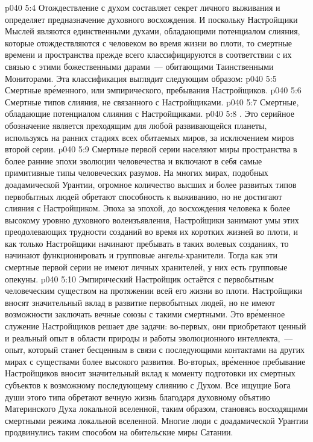 \vs p040 5:4 \pc Отождествление с духом составляет секрет личного выживания и определяет предназначение духовного восхождения. И поскольку Настройщики Мыслей являются единственными духами, обладающими потенциалом слияния, которые отождествляются с человеком во время жизни во плоти, то смертные времени и пространства прежде всего классифицируются в соответствии с их связью с этими божественными дарами~--- обитающими Таинственными Мониторами. Эта классификация выглядит следующим образом:
\vs p040 5:5 Смертные вр\'еменного, или эмпирического, пребывания Настройщиков.
\vs p040 5:6 Смертные типов слияния, не связанного с Настройщиками.
\vs p040 5:7 Смертные, обладающие потенциалом слияния с Настройщиками.
\vs p040 5:8 \pc {}. Это серийное обозначение является преходящим для любой развивающейся планеты, используясь на ранних стадиях всех обитаемых миров, за исключением миров второй серии.
\vs p040 5:9 Смертные первой серии населяют миры пространства в более ранние эпохи эволюции человечества и включают в себя самые примитивные типы человеческих разумов. На многих мирах, подобных доадамической Урантии, огромное количество высших и более развитых типов первобытных людей обретают способность к выживанию, но не достигают слияния с Настройщиком. Эпоха за эпохой, до восхождения человека к более высокому уровню духовного волеизъявления, Настройщики занимают умы этих преодолевающих трудности созданий во время их коротких жизней во плоти, и как только Настройщики начинают пребывать в таких волевых созданиях, то начинают функционировать и групповые ангелы\hyp{}хранители. Тогда как эти смертные первой серии не имеют личных хранителей, у них есть групповые опекуны.
\vs p040 5:10 Эмпирический Настройщик остаётся с первобытным человеческим существом на протяжении всей его жизни во плоти. Настройщики вносят значительный вклад в развитие первобытных людей, но не имеют возможности заключать вечные союзы с такими смертными. Это вр\'еменное служение Настройщиков решает две задачи: во\hyp{}первых, они приобретают ценный и реальный опыт в области природы и работы эволюционного интеллекта,~--- опыт, который станет бесценным в связи с последующими контактами на других мирах с существами более высокого развития. Во\hyp{}вторых, вр\'еменное пребывание Настройщиков вносит значительный вклад к моменту подготовки их смертных субъектов к возможному последующему слиянию с Духом. Все ищущие Бога души этого типа обретают вечную жизнь благодаря духовному объятию Материнского Духа локальной вселенной, таким образом, становясь восходящими смертными режима локальной вселенной. Многие люди с доадамической Урантии продвинулись таким способом на обительские миры Сатании.
